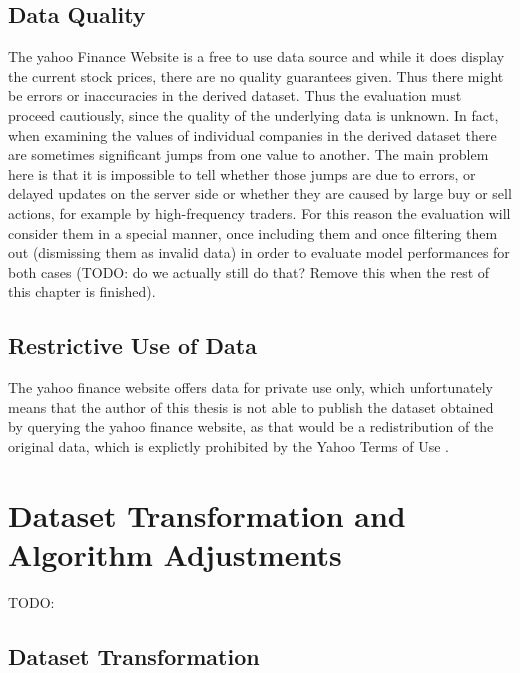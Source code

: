 \subsection{Data Quality}
\label{subsec_dataQuality}
The yahoo Finance Website is a free to use data source and while it does display the current stock prices, there are no quality guarantees given. Thus there might be errors or inaccuracies in the derived dataset. Thus the evaluation must proceed cautiously, since the quality of the underlying data is unknown. In fact, when examining the values of individual companies in the derived dataset there are sometimes significant jumps from one value to another. The main problem here is that it is impossible to tell whether those jumps are due to errors, or delayed updates on the server side or whether they are caused by large buy or sell actions, for example by high-frequency traders. For this reason the evaluation will consider them in a special manner, once including them and once filtering them out (dismissing them as invalid data) in order to evaluate model performances for both cases (TODO: do we actually still do that? Remove this when the rest of this chapter is finished). 

\subsection{Restrictive Use of Data}
The yahoo finance website offers data for private use only, which unfortunately means that the author of this thesis is not able to publish the dataset obtained by querying the yahoo finance website, as that would be a redistribution of the original data, which is explictly prohibited by the Yahoo Terms of Use \cite{yahooTermsDeveloper}.

\section{Dataset Transformation and Algorithm Adjustments}
\label{sec_transformation}

TODO: 


\subsection{Dataset Transformation}

